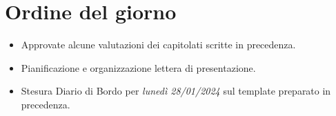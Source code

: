 \section{Ordine del giorno}

\begin{itemize}
    \item Approvate alcune valutazioni dei capitolati scritte in precedenza.
    \item Pianificazione e organizzazione lettera di presentazione.
    \item Stesura Diario di Bordo per \emph{lunedì 28/01/2024} sul template preparato in precedenza.
\end{itemize}